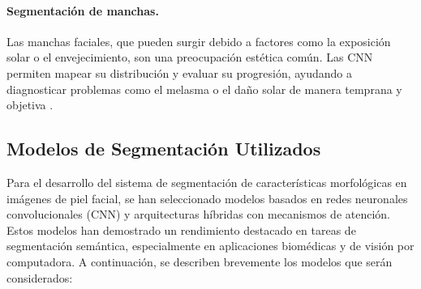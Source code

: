 
\paragraph{Segmentación de manchas.}  
Las manchas faciales, que pueden surgir debido a factores como la exposición solar o el envejecimiento, son una preocupación estética común. Las CNN permiten mapear su distribución y evaluar su progresión, ayudando a diagnosticar problemas como el melasma o el daño solar de manera temprana y objetiva \parencite{autor2020segmentacion}.




\subsection{Modelos de Segmentación Utilizados}

Para el desarrollo del sistema de segmentación de características morfológicas en imágenes de piel facial, se han seleccionado modelos basados en redes neuronales convolucionales (CNN) y arquitecturas híbridas con mecanismos de atención. Estos modelos han demostrado un rendimiento destacado en tareas de segmentación semántica, especialmente en aplicaciones biomédicas y de visión por computadora. A continuación, se describen brevemente los modelos que serán considerados:

